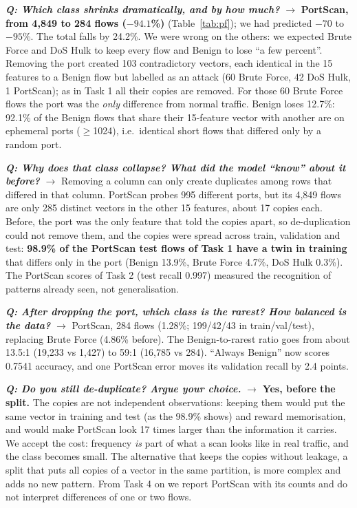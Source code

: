 \documentclass[9pt]{extarticle}
\newcommand{\Q}[1]{\textbf{\emph{Q: #1}}}
\begin{document}
\Q{Which class shrinks dramatically, and by how much?} $\rightarrow$ \textbf{PortScan, from 4,849 to 284 flows ($-94.1$\%)} (Table~\ref{tab:pf}); we had predicted $-70$ to $-95$\%. The total falls by 24.2\%. We were wrong on the others: we expected Brute Force and DoS Hulk to keep every flow and Benign to lose ``a few percent''. Removing the port created 103 contradictory vectors, each identical in the 15 features to a Benign flow but labelled as an attack (60 Brute Force, 42 DoS Hulk, 1 PortScan); as in Task 1 all their copies are removed. For those 60 Brute Force flows the port was the \emph{only} difference from normal traffic. Benign loses 12.7\%: 92.1\% of the Benign flows that share their 15-feature vector with another are on ephemeral ports ($\ge$1024), i.e.\ identical short flows that differed only by a random port.

\Q{Why does that class collapse? What did the model ``know'' about it before?} $\rightarrow$ Removing a column can only create duplicates among rows that differed in that column. PortScan probes 995 different ports, but its 4,849 flows are only 285 distinct vectors in the other 15 features, about 17 copies each. Before, the port was the only feature that told the copies apart, so de-duplication could not remove them, and the copies were spread across train, validation and test: \textbf{98.9\% of the PortScan test flows of Task 1 have a twin in training} that differs only in the port (Benign 13.9\%, Brute Force 4.7\%, DoS Hulk 0.3\%). The PortScan scores of Task 2 (test recall 0.997) measured the recognition of patterns already seen, not generalisation.

\Q{After dropping the port, which class is the rarest? How balanced is the data?} $\rightarrow$ PortScan, 284 flows (1.28\%; 199/42/43 in train/val/test), replacing Brute Force (4.86\% before). The Benign-to-rarest ratio goes from about 13.5:1 (19,233 vs 1,427) to 59:1 (16,785 vs 284). ``Always Benign'' now scores 0.7541 accuracy, and one PortScan error moves its validation recall by 2.4 points.

\Q{Do you still de-duplicate? Argue your choice.} $\rightarrow$ \textbf{Yes, before the split.} The copies are not independent observations: keeping them would put the same vector in training and test (as the 98.9\% shows) and reward memorisation, and would make PortScan look 17 times larger than the information it carries. We accept the cost: frequency \emph{is} part of what a scan looks like in real traffic, and the class becomes small. The alternative that keeps the copies without leakage, a split that puts all copies of a vector in the same partition, is more complex and adds no new pattern. From Task 4 on we report PortScan with its counts and do not interpret differences of one or two flows.
\end{document}
